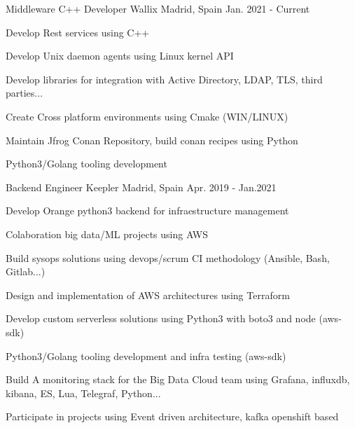 

\begin{cventries}

  \cventry
    {Middleware C++ Developer} %
    {Wallix} %
    {Madrid, Spain} %
    {Jan. 2021 - Current} %
    {
      \begin{cvitems} %
        \item {Develop Rest services using C++}
        \item {Develop Unix daemon agents using Linux kernel API}
        \item {Develop libraries for integration with Active Directory, LDAP, TLS, third parties...}
        \item {Create Cross platform environments using Cmake (WIN/LINUX)}
        \item {Maintain Jfrog Conan Repository, build conan recipes using Python} 
        \item {Python3/Golang tooling development}
      \end{cvitems}
    }
  \cventry
    {Backend Engineer} %
    {Keepler} %
    {Madrid, Spain} %
    {Apr. 2019 - Jan.2021} %
    {
      \begin{cvitems} %
        \item {Develop Orange python3 backend for infraestructure management}
        \item {Colaboration big data/ML projects using AWS}
        \item {Build sysops solutions using devops/scrum CI methodology (Ansible, Bash, Gitlab...)}
        \item {Design and implementation of AWS architectures using Terraform}
        \item {Develop custom serverless solutions using Python3 with boto3 and node (aws-sdk)} 
        \item {Python3/Golang tooling development and infra testing (aws-sdk)} 
        \item {Build A monitoring stack for the Big Data Cloud team using Grafana, influxdb, kibana, ES, Lua, Telegraf, Python...} 
        \item {Participate in projects using Event driven architecture, kafka openshift based} 
      \end{cvitems}
    }


\end{cventries}

